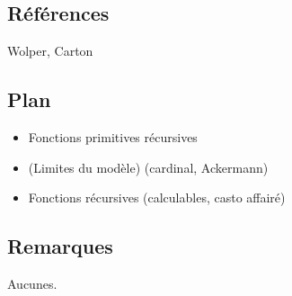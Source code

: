 \documentclass[../../agregation.tex]{subfiles}
\begin{document}

\dvts

\subsection{Références}

Wolper, Carton

\subsection{Plan}

\begin{itemize}
	\item Fonctions primitives récursives
	\item (Limites du modèle) (cardinal, Ackermann)
	\item Fonctions récursives (calculables, casto affairé)
\end{itemize}

\subsection{Remarques}

Aucunes.
\end{document}

